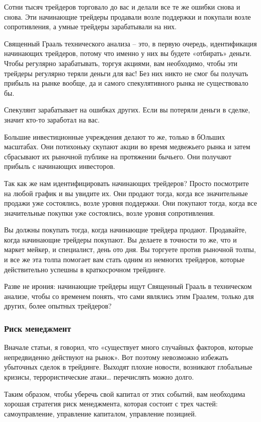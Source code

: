 \documentclass[a5paper]{article}
\begin{document}
Сотни тысяч трейдеров торговало до вас и делали все те же ошибки снова и снова. Эти начинающие трейдеры продавали возле поддержки и покупали возле сопротивления, а умные трейдеры зарабатывали на них.

Священный Грааль технического анализа – это, в первую очередь, идентификация начинающих трейдеров, потому что именно у них вы будете «отбирать» деньги. Чтобы регулярно зарабатывать, торгуя акциями, вам необходимо, чтобы эти трейдеры регулярно теряли деньги для вас! Без них никто не смог бы получать прибыль на рынке вообще, да и самого спекулятивного рынка не существовало бы.

Спекулянт зарабатывает на ошибках других. Если вы потеряли деньги в сделке, значит кто-то заработал на вас.

Большие инвестиционные учреждения делают то же, только в бОльших масштабах. Они потихоньку скупают акции во время медвежьего рынка и затем сбрасывают их рыночной публике на протяжении бычьего. Они получают прибыль с начинающих инвесторов.

Так как же нам идентифицировать начинающих трейдеров? Просто посмотрите на любой график и вы увидите их. Они продают тогда, когда все значительные продажи уже состоялись, возле уровня поддержки. Они покупают тогда, когда все значительные покупки уже состоялись, возле уровня сопротивления.

Вы должны покупать тогда, когда начинающие трейдера продают. Продавайте, когда начинающие трейдеры покупают. Вы делаете в точности то же, что и маркет мейкер, и специалист, день ото дня. Вы торгуете против рыночной толпы, и все же эта толпа помогает вам стать одним из немногих трейдеров, которые действительно успешны в краткосрочном трейдинге.

Разве не ирония: начинающие трейдеры ищут Священный Грааль в
техническом анализе, чтобы со временем понять, что сами являлись этим
Граалем, только для других, более опытных трейдеров?

\subsubsection{Риск менеджмент}

Вначале статьи, я говорил, что «существует много случайных факторов, которые непредвиденно действуют на рынок». Вот поэтому невозможно избежать убыточных сделок в трейдинге. Выходят плохие новости, возникают глобальные кризисы, террористические атаки… перечислять можно долго.

Таким образом, чтобы уберечь свой капитал от этих событий, вам необходима хорошая стратегия риск менеджмента, которая состоит с трех частей: самоуправление, управление капиталом, управление позицией.
\end{document}

